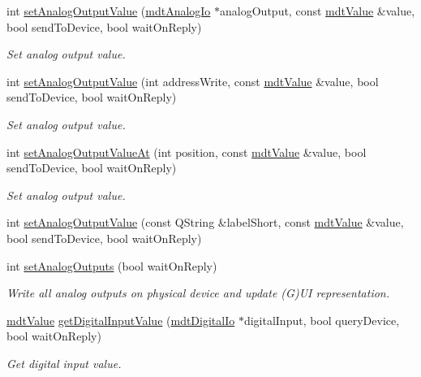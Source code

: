 \begin{DoxyCompactItemize}
int \hyperlink{classmdt_device_a766d9adcf8c2274f61f120a4a5c5c6d9}{set\-Analog\-Output\-Value} (\hyperlink{classmdt_analog_io}{mdt\-Analog\-Io} $\ast$analog\-Output, const \hyperlink{classmdt_value}{mdt\-Value} \&value, bool send\-To\-Device, bool wait\-On\-Reply)
\begin{DoxyCompactList}\small\item\em Set analog output value. \end{DoxyCompactList}\item 
int \hyperlink{classmdt_device_ab605f81f28271f54570f151e94039807}{set\-Analog\-Output\-Value} (int address\-Write, const \hyperlink{classmdt_value}{mdt\-Value} \&value, bool send\-To\-Device, bool wait\-On\-Reply)
\begin{DoxyCompactList}\small\item\em Set analog output value. \end{DoxyCompactList}\item 
int \hyperlink{classmdt_device_a2db6bcd6d69cba9e8be0e68388d75030}{set\-Analog\-Output\-Value\-At} (int position, const \hyperlink{classmdt_value}{mdt\-Value} \&value, bool send\-To\-Device, bool wait\-On\-Reply)
\begin{DoxyCompactList}\small\item\em Set analog output value. \end{DoxyCompactList}\item 
int \hyperlink{classmdt_device_a40b49f882622c37f50a57132f954e732}{set\-Analog\-Output\-Value} (const Q\-String \&label\-Short, const \hyperlink{classmdt_value}{mdt\-Value} \&value, bool send\-To\-Device, bool wait\-On\-Reply)
\item 
int \hyperlink{classmdt_device_a57e1cee7e670469035c57e3bd2ff4c9d}{set\-Analog\-Outputs} (bool wait\-On\-Reply)
\begin{DoxyCompactList}\small\item\em Write all analog outputs on physical device and update (G)U\-I representation. \end{DoxyCompactList}\item 
\hyperlink{classmdt_value}{mdt\-Value} \hyperlink{classmdt_device_afe8bd7811ccc4a2ba8088edf073e0a8d}{get\-Digital\-Input\-Value} (\hyperlink{classmdt_digital_io}{mdt\-Digital\-Io} $\ast$digital\-Input, bool query\-Device, bool wait\-On\-Reply)
\begin{DoxyCompactList}\small\item\em Get digital input value. \end{DoxyCompactList}\item 

\end{DoxyCompactItemize}
